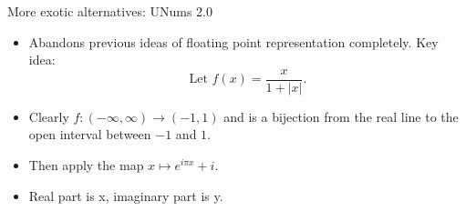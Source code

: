 \documentclass{beamer}
\begin{document}
\begin{frame}{More exotic alternatives: UNums 2.0}
\begin{itemize}
\item Abandons previous ideas of floating point representation completely. Key idea:
\begin{equation*}
\text{Let }f(x) = \frac{x}{1 + |x|}.
\end{equation*}
\item Clearly $f: (-\infty, \infty) \to (-1, 1)$ and is a bijection from the real line to the open interval
between $-1$ and $1$.
\item Then apply the map $x \mapsto e^{i \pi x} + i$.

\begin{minipage}{\textwidth}\centering
{}
\end{minipage}

\item Real part is x, imaginary part is y.
\end{itemize}
\end{frame}
\end{document}
